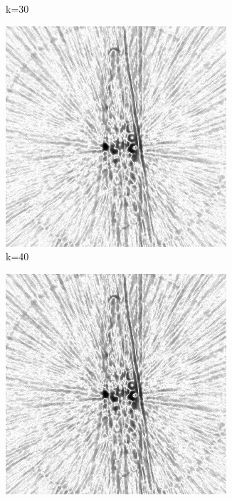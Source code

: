 \documentclass[journal]{IEEEtran}
\begin{document}
\begin{figure}[h]
\begin{subfigure}[b]{0.24\linewidth}
        \caption{k=30}
     \end{subfigure}
  \begin{subfigure}[b]{0.24\linewidth}
        \includegraphics[width=\textwidth]{../images/okra/post_TCI/2D/48_views/tuning_k/weightsIm_kk_40_lambda_prior_0.700000.png}
        \caption{k=40}
     \end{subfigure}
  \begin{subfigure}[b]{0.24\linewidth}
        \includegraphics[width=\textwidth]{../images/okra/post_TCI/2D/48_views/tuning_k/weightsIm_kk_50_lambda_prior_0.700000.png}

\end{subfigure}
\end{figure}
\end{document}
